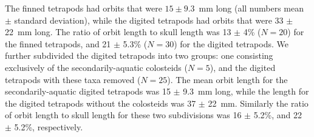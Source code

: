  The finned tetrapods had orbits that were $15 \pm 9.3$~mm long (all numbers mean $\pm$ standard deviation), while the digited tetrapods had orbits that were 33 $\pm$ 22~mm long. The ratio of orbit length to skull length was 13 $\pm$ 4\% ($N=20$) for the finned tetrapods, and 21 $\pm$  5.3\% ($N=30$) for the digited tetrapods. We further subdivided the digited tetrapods into two groups: one consisting exclusively of the secondarily-aquatic colosteids ($N=5$), and the digited tetrapods with these taxa removed ($N=25$). The mean orbit length for the secondarily-aquatic digited tetrapods was 15 $\pm$ 9.3~mm long, while the length for the digited tetrapods without the colosteids was 37 $\pm$ 22~mm. Similarly the ratio of orbit length to skull length for these two subdivisions was 16 $\pm$ 5.2\%, and 22 $\pm$ 5.2\%, respectively.